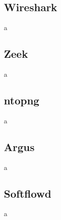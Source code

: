 \subsection{Wireshark}

a

\subsection{Zeek}

a

\subsection{ntopng}

a

\subsection{Argus}

a

\subsection{Softflowd}

a

